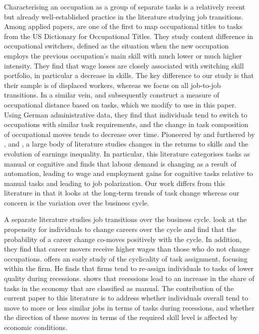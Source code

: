 \documentclass[11pt, oneside]{article}
\begin{document}
	Characterising an occupation as a group of separate tasks is a relatively recent but already well-established practice in the literature studying job transitions. Among applied papers, \cite{Poletaev2008} are one of the first to map occupational titles to tasks from the US Dictionary for Occupational Titles. %
	They study content difference in occupational switchers, defined as the situation when the new occupation employs the previous occupation's main skill with much lower or much higher intensity. They find that wage losses are closely associated with switching skill portfolio, in particular a decrease in skills. The key difference to our study is that their sample is of displaced workers, whereas we focus on all job-to-job transitions. %
	In a similar vein, \cite{Gathmann2010} and subsequently \cite{robinson2018} construct a measure of occupational distance based on tasks, which we modify to use in this paper. Using German administrative data, they find that individuals tend to switch to occupations with similar task requirements, and the change in task composition of occupational moves tends to decrease over time.  Pioneered by \cite{ALM2003} and furthered by \cite{AcemogluAutor2011}, \cite{AutorDorn2013}  and \cite{GoosManningSalomons2014}, a large body of literature studies changes in the returns to skills and the evolution of earnings inequality. In particular, this literature categorises tasks as manual or cognitive and finds that labour demand is changing as a result of automation, leading to wage and employment gains for cognitive tasks relative to manual tasks and leading to job polarization. Our work differs from this literature in that it looks at the long-term trends of task change whereas our concern is the variation over the business cycle.
	
	\vspace{2mm}
	

	
	
	
	\vspace{2mm}
	
	
	A separate literature studies job transitions over the business cycle. \cite{Carrillo-Tudela2016} look at the propensity for individuals to change careers over the cycle and find that the probability of a career change co-moves positively with the cycle. In addition, they find that career movers receive higher wages than those who do not change occupations. \cite{Devereux2000} offers an early study of the cyclicality of task assignment, focusing within the firm. He finds that firms tend to re-assign individuals to tasks of lower quality during recessions. \cite{Summerfield2016} shows that recessions lead to an increase in the share of tasks in the economy that are classified as manual. The contribution of the current paper to this literature is to address whether individuals overall tend to move to more or less similar jobs in terms of tasks during recessions, and whether the direction of these moves in terms of the required skill level is affected by economic conditions.
	
\end{document}
